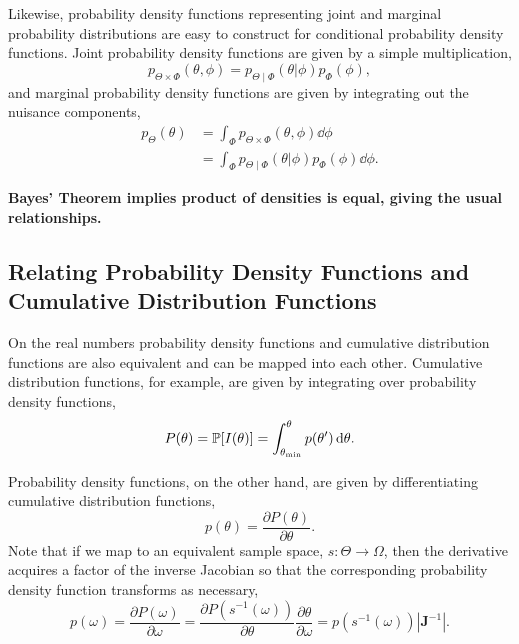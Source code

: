 Likewise, probability density functions representing joint and marginal 
probability distributions are easy to construct for conditional probability 
density functions.  Joint probability density functions are given by a simple
multiplication,
%
\begin{equation*}
p_{\Theta \times \Phi} \! \left( \theta, \phi \right) = 
p_{\Theta \mid \Phi} \! \left( \theta | \phi \right) p_{\Phi} \! \left( \phi \right),
\end{equation*}
%
and marginal probability density functions are given by integrating out the
nuisance components,
%
\begin{align*}
p_{\Theta} \! \left( \theta \right)
&= 
\int_{\Phi} p_{\Theta \times \Phi} \! \left( \theta, \phi \right) \dd \phi \\
&=
\int_{\Phi}
p_{\Theta \mid \Phi} \! \left( \theta | \phi \right) 
p_{\Phi} \! \left( \phi \right) \dd \phi.
\end{align*}

\textbf{Bayes' Theorem implies product of densities is equal, giving
the usual relationships.}

\subsection{Relating Probability Density Functions and Cumulative 
Distribution Functions}

On the real numbers probability density functions and cumulative 
distribution functions are also equivalent and can be mapped into 
each other.  Cumulative distribution functions, for example, are given 
by integrating over probability density functions,
%
\begin{equation*}
P \! \left( \theta \right)
= \mathbb{P} \! \left[ I \! \left( \theta \right) \right]
= \int_{\theta_{\min}}^{\theta} p \! \left( \theta' \right) \mathrm{d} \theta.
\end{equation*}

Probability density functions, on the other hand, are given by 
differentiating cumulative distribution functions,
%
\begin{equation*}
p \! \left( \theta \right) = 
\frac{\partial P \! \left( \theta \right) }{ \partial \theta}.
\end{equation*}
%
Note that if we map to an equivalent sample space, 
$s : \Theta \rightarrow \Omega$, then the derivative
acquires a factor of the inverse Jacobian so that the
corresponding probability density function transforms
as necessary,
%
\begin{equation*}
p \! \left( \omega \right) 
= 
\frac{\partial P \! \left( \omega \right) }{ \partial \omega}
=
\frac{\partial P \! \left( s^{-1} \! \left( \omega \right) \right) }
{ \partial \theta}
\frac{ \partial \theta }{ \partial \omega }
= 
p \! \left( s^{-1} \! \left( \omega \right) \right) \left| \mathbf{J}^{-1} \right|.
\end{equation*}

